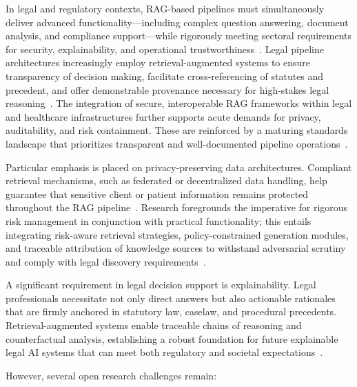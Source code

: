 \documentclass[sigconf]{acmart}
\begin{document}
In legal and regulatory contexts, RAG-based pipelines must simultaneously deliver advanced functionality—including complex question answering, document analysis, and compliance support—while rigorously meeting sectoral requirements for security, explainability, and operational trustworthiness~\cite{ref63, ref64}. Legal pipeline architectures increasingly employ retrieval-augmented systems to ensure transparency of decision making, facilitate cross-referencing of statutes and precedent, and offer demonstrable provenance necessary for high-stakes legal reasoning~\cite{ref63}. The integration of secure, interoperable RAG frameworks within legal and healthcare infrastructures further supports acute demands for privacy, auditability, and risk containment. These are reinforced by a maturing standards landscape that prioritizes transparent and well-documented pipeline operations~\cite{ref63, ref64}.

Particular emphasis is placed on privacy-preserving data architectures. Compliant retrieval mechanisms, such as federated or decentralized data handling, help guarantee that sensitive client or patient information remains protected throughout the RAG pipeline~\cite{ref21, ref22, ref23, ref24, ref25, ref26, ref32, ref33, ref34, ref36, ref37, ref38, ref39, ref40, ref43, ref45, ref46, ref49, ref50, ref54, ref55, ref63}. Research foregrounds the imperative for rigorous risk management in conjunction with practical functionality; this entails integrating risk-aware retrieval strategies, policy-constrained generation modules, and traceable attribution of knowledge sources to withstand adversarial scrutiny and comply with legal discovery requirements~\cite{ref2, ref3, ref5, ref8, ref10, ref13, ref14, ref15, ref16, ref17, ref18, ref19, ref20, ref21, ref22, ref23, ref24, ref25, ref26, ref29, ref30, ref32, ref33, ref34, ref36, ref37, ref38, ref39, ref40, ref43, ref45, ref46, ref49, ref50, ref54, ref55, ref63}.

A significant requirement in legal decision support is explainability. Legal professionals necessitate not only direct answers but also actionable rationales that are firmly anchored in statutory law, caselaw, and procedural precedents. Retrieval-augmented systems enable traceable chains of reasoning and counterfactual analysis, establishing a robust foundation for future explainable legal AI systems that can meet both regulatory and societal expectations~\cite{ref63}.

However, several open research challenges remain:
\end{document}
